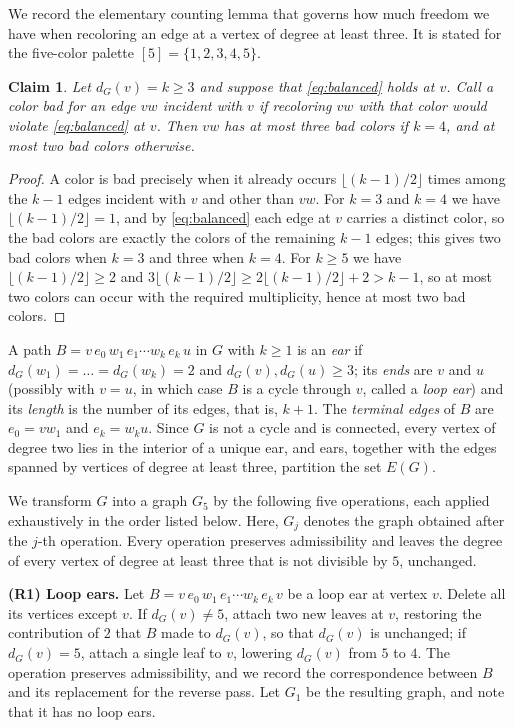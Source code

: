 \documentclass[11pt]{article}
\newtheorem{claim}[theorem]{Claim}
\theoremstyle{definition}
\begin{document}
We record the elementary counting lemma that governs how much freedom we have when recoloring an edge at a vertex of degree at least three. It is stated for the five-color palette $[5]=\{1,2,3,4,5\}$.

\begin{claim}\label{claim:bad}
Let $d_G(v)=k\ge 3$ and suppose that \eqref{eq:balanced} holds at $v$. Call a color \emph{bad} for an edge $vw$ incident with $v$ if recoloring $vw$ with that color would violate \eqref{eq:balanced} at $v$. Then $vw$ has at most three bad colors if $k=4$, and at most two bad colors otherwise.
\end{claim}

\begin{proof}
A color is bad precisely when it already occurs $\lfloor (k-1)/2\rfloor$ times among the $k-1$ edges incident with $v$ and other than $vw$. For $k=3$ and $k=4$ we have $\lfloor (k-1)/2\rfloor=1$, and by \eqref{eq:balanced} each edge at $v$ carries a distinct color, so the bad colors are exactly the colors of the remaining $k-1$ edges; this gives two bad colors when $k=3$ and three when $k=4$. For $k\ge 5$ we have $\lfloor (k-1)/2\rfloor\ge 2$ and
$3\lfloor (k-1)/2\rfloor\geq 2\lfloor (k-1)/2\rfloor+2>  k-1$, so at most two colors can occur with the required multiplicity, hence at most two bad colors.
\end{proof}

A path $B=v\,e_0\,w_1\,e_1\cdots w_k\,e_k\,u$ in $G$ with $k\ge 1$ is an \emph{ear} if $d_G(w_1)=\dots=d_G(w_k)=2$ and $d_G(v),d_G(u)\ge 3$; its \emph{ends} are $v$ and $u$ (possibly with $v=u$, in which case $B$ is a cycle through $v$, called a \emph{loop ear}) and its \emph{length} is the number of its edges, that is, $k+1$. The
\emph{terminal edges} of $B$ are $e_0=vw_1$ and $e_k=w_ku$. Since $G$ is not a cycle and is connected, every vertex of degree two lies in the interior of a unique ear, and ears, together with the edges spanned by vertices of degree at least three, partition the set $E(G)$.

We transform $G$ into a graph $G_5$ by the following five operations, each applied exhaustively in the order listed below. Here, $G_j$ denotes the graph obtained after the $j$-th operation. Every operation preserves admissibility and leaves the degree
of every vertex of degree at least three that is not divisible by $5$, unchanged.

\medskip
\noindent\textbf{(R1) Loop ears.}
Let $B=v\,e_0\,w_1\,e_1\cdots w_k\,e_k\,v$ be a loop ear at vertex $v$. Delete all its vertices except $v$. If $d_G(v)\neq 5$, attach two new leaves at $v$, restoring the contribution of $2$ that $B$ made to $d_G(v)$, so that $d_G(v)$ is unchanged; if $d_G(v)=5$,
attach a single leaf to $v$, lowering $d_G(v)$ from $5$ to $4$. The operation preserves admissibility, and we record the correspondence between $B$ and its replacement for the reverse pass. Let $G_1$ be the resulting graph, and note that it has no loop ears.
\end{document}

